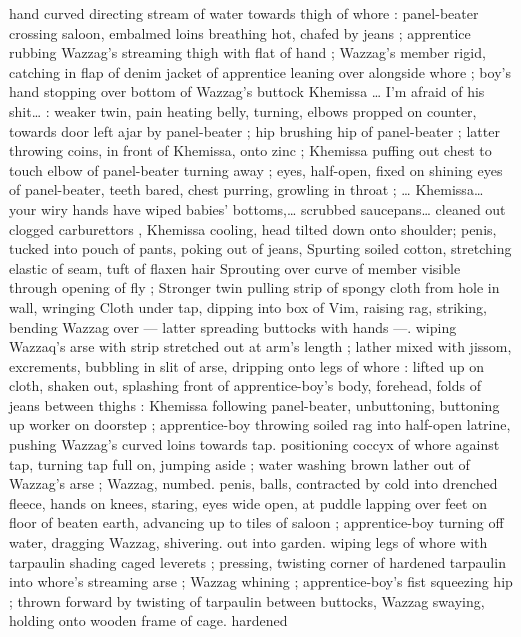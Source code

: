 hand curved directing stream of water towards thigh of whore : 
panel-beater crossing saloon, embalmed loins breathing hot, chafed 
by jeans ; apprentice rubbing Wazzag's streaming thigh with flat of 
hand ; Wazzag's member rigid, catching in flap of denim jacket of 
apprentice leaning over alongside whore ; boy's hand stopping over 
bottom of Wazzag's buttock{\td} {\gl} Khemissa {\ldots} I'm afraid of his shit{\ldots} {\gr} 
: weaker twin, pain heating belly, turning, elbows propped on 
counter, towards door left ajar by panel-beater ; hip brushing hip of 
panel-beater ; latter throwing coins, in front of Khemissa, onto zinc ; 
Khemissa puffing out chest to touch elbow of panel-beater turning 
away ; eyes, half-open, fixed on shining eyes of panel-beater, teeth 
bared, chest purring, growling in throat ; {\ldots}{\gl} Khemissa{\ldots} your wiry 
hands have wiped babies' bottoms,{\ldots} scrubbed saucepans{\ldots} cleaned 
out clogged carburettors{\td} {\gr}, Khemissa cooling, head tilted down onto 
shoulder; penis, tucked into pouch of pants, poking out of jeans, 
Spurting soiled cotton, stretching elastic of seam, tuft of flaxen hair 
Sprouting over curve of member visible through opening of fly ; 
Stronger twin pulling strip of spongy cloth from hole in wall, wringing 
Cloth under tap, dipping into box of Vim, raising rag, striking, 
bending Wazzag over --- latter spreading buttocks with hands ---. 
wiping Wazzaq's arse with strip stretched out at arm's length ; lather 
mixed with jissom, excrements, bubbling in slit of arse, dripping onto 
legs of whore : lifted up on cloth, shaken out, splashing front of 
apprentice-boy's body, forehead, folds of jeans between thighs : 
Khemissa following panel-beater, unbuttoning, buttoning up worker 
on doorstep ; apprentice-boy throwing soiled rag into half-open 
latrine, pushing Wazzag's curved loins towards tap. positioning 
coccyx of whore against tap, turning tap full on, jumping aside ; 
water washing brown lather out of Wazzag's arse ; Wazzag, numbed. 
penis, balls, contracted by cold into drenched fleece, hands on 
knees, staring, eyes wide open, at puddle lapping over feet on floor 
of beaten earth, advancing up to tiles of saloon ; apprentice-boy 
turning off water, dragging Wazzag, shivering. out into garden. 
wiping legs of whore with tarpaulin shading caged leverets ; 
pressing, twisting corner of hardened tarpaulin into whore's 
streaming arse ; Wazzag whining ; apprentice-boy's fist squeezing 
hip ; thrown forward by twisting of tarpaulin between buttocks, 
Wazzag swaying, holding onto wooden frame of cage. hardened 
